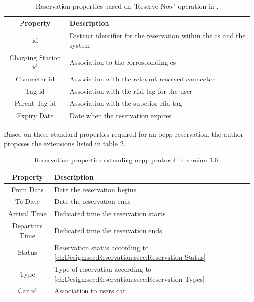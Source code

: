 \begingroup
\setlength{\tabcolsep}{10pt} %
\renewcommand{\arraystretch}{1.5} %
\begin{table}[h]
    \centering
    \caption{Reservation properties based on 'Reserve Now' operation in \cite{noauthor_ocpp_nodate}.}
    \begin{tabular}{c|m{10cm}}
        Property & Description \\ \hline
        \acrshort{id} & Distinct identifier for the reservation within the \acrshort{cs} and the system \\
        Charging Station \acrshort{id} & Association to the corresponding \acrshort{cs} \\
        Connector \acrshort{id} & Association with the relevant reserved connector \\
        Tag \acrshort{id} & Association with the \acrshort{rfid} tag for the user \\
        Parent Tag \acrshort{id} & Association with the superior \acrshort{rfid} tag \\
        Expiry Date & Date when the reservation expires
    \end{tabular}
    \label{tab:reservation-ocpp-properties}
\end{table}
\endgroup

\noindent Based on these standard properties required for an \acrshort{ocpp} reservation, the author proposes the extensions listed in table \ref{tab:reservation-extended-properties}.

\begingroup
\setlength{\tabcolsep}{10pt} %
\renewcommand{\arraystretch}{1.5} %
\begin{table}[h]
    \centering
    \caption{Reservation properties extending \acrshort{ocpp} protocol in version 1.6.}
    \begin{tabular}{c|m{10cm}}
        Property & Description \\ \hline
        From Date & Date the reservation begins \\ 
        To Date & Date the reservation ends \\
        Arrival Time & Dedicated time the reservation starts \\
        Departure Time & Dedicated time the reservation ends \\
        Status & Reservation status according to \ref{ch:Design:sec:Reservation:ssec:Reservation Status} \\
        Type & Type of reservation according to \ref{ch:Design:sec:Reservation:ssec:Reservation Types} \\
        Car \acrshort{id} & Association to users car 
    \end{tabular}
    \label{tab:reservation-extended-properties}
\end{table}
\endgroup

